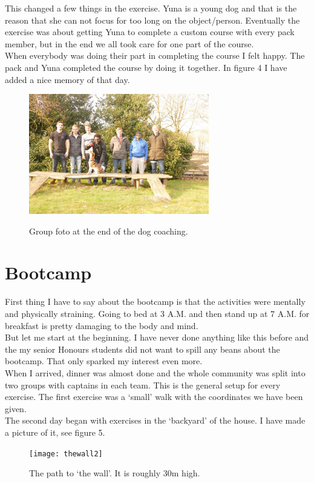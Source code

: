 \documentclass{article}
\begin{document}
This changed a few things in the exercise. Yuna is a young dog and that is the reason that she can not focus for too long on the object/person. Eventually the exercise was about getting Yuna to complete a custom course with every pack member, but in the end we all took care for one part of the course.\\

When everybody was doing their part in completing the course I felt happy. The pack and Yuna completed the course by doing it together. In figure 4 I have added a nice memory of that day.

\begin{figure}[!h]
	\centering
	\includegraphics[width=0.7\textwidth]{Dogcoaching}
	\label{fig:Dogcoaching}
	\caption{Group foto at the end of the dog coaching.}
\end{figure}
\newpage
\section{Bootcamp}
First thing I have to say about the bootcamp is that the activities were mentally and physically straining. Going to bed at 3 A.M. and then stand up at 7 A.M. for breakfast is pretty damaging to the body and mind.\\

But let me start at the beginning. I have never done anything like this before and the my senior Honours students did not want to spill any beans about the bootcamp. That only sparked my interest even more.\\

When I arrived, dinner was almost done and the whole community was split into two groups with captains in each team. This is the general setup for every exercise. The first exercise was a `small' walk with the coordinates we have been given. \\

The second day began with exercises in the `backyard' of the house. I have made a picture of it, see figure 5.
\begin{figure}[!h]
	\centering
	\texttt{[image: thewall2]}
	\label{fig:thewall2}
	\caption{The path to `the wall'. It is roughly 30m high.}
\end{figure}
\end{document}
